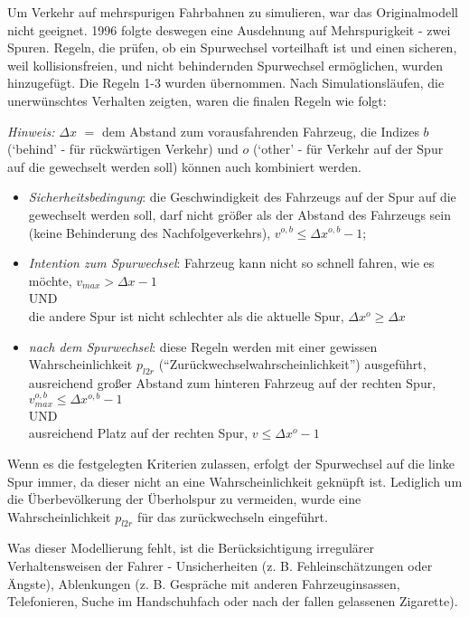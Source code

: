 Um Verkehr auf mehrspurigen Fahrbahnen zu simulieren, war das Originalmodell nicht geeignet. 
1996 folgte deswegen eine Ausdehnung auf Mehrspurigkeit \cite{multi-lane} - zwei Spuren. 
Regeln, die prüfen, ob ein Spurwechsel vorteilhaft ist und einen sicheren, weil kollisionsfreien, und nicht behindernden Spurwechsel ermöglichen, wurden hinzugefügt. Die Regeln 1-3 wurden übernommen. Nach Simulationsläufen, die unerwünschtes Verhalten zeigten, waren die finalen Regeln wie folgt:

\textit{Hinweis:} $\Delta x$ $\widehat{=}$ dem Abstand zum vorausfahrenden Fahrzeug, die Indizes $b$ (\enquote*{behind} - für rückwärtigen Verkehr) und $o$ (\enquote*{other} - für Verkehr auf der Spur auf die gewechselt werden soll) können auch kombiniert werden. 

\begin{itemize}
	\item \textit{Sicherheitsbedingung}: die Geschwindigkeit des Fahrzeugs auf der Spur auf die gewechselt werden soll, darf nicht größer als der Abstand des Fahrzeugs sein (keine Behinderung des Nachfolgeverkehrs), $v^{o,b} \leq \Delta x^{o,b}-1$;
	\item \textit{Intention zum Spurwechsel}: Fahrzeug kann nicht so schnell fahren, wie es möchte, $v_{max} > \Delta x-1$ \\
	UND\\
	die andere Spur ist nicht schlechter als die aktuelle Spur, $\Delta x^{o} \geq \Delta x$
	\item \textit{nach dem Spurwechsel}: diese Regeln werden mit einer gewissen Wahrscheinlichkeit $p_{l2r}$ (\enquote{Zurückwechselwahrscheinlichkeit}) ausgeführt, \\
	ausreichend großer Abstand zum hinteren Fahrzeug auf der rechten Spur, $v^{o,b}_{max} \leq \Delta x^{o,b}-1$ \\
	UND \\
	ausreichend Platz auf der rechten Spur, $v \leq \Delta x^{o}-1$
\end{itemize}

Wenn es die festgelegten Kriterien zulassen, erfolgt der Spurwechsel auf die linke Spur immer, da dieser nicht an eine Wahrscheinlichkeit geknüpft ist.
Lediglich um die Überbevölkerung der Überholspur zu vermeiden, wurde eine Wahrscheinlichkeit $p_{l2r}$ für das zurückwechseln eingeführt.

Was dieser Modellierung fehlt, ist die Berücksichtigung irregulärer Verhaltensweisen der Fahrer - Unsicherheiten (z. B. Fehleinschätzungen oder Ängste), Ablenkungen (z. B. Gespräche mit anderen Fahrzeuginsassen, Telefonieren, Suche im Handschuhfach oder nach der fallen gelassenen Zigarette). 

